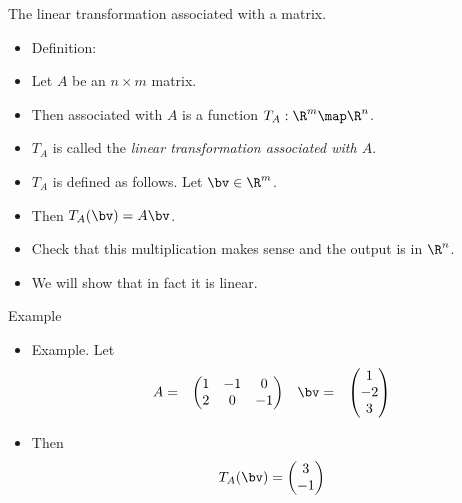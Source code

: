 \documentclass{beamer}
\begin{document}
\begin{frame}{The linear transformation associated with a matrix.}

\begin{itemize}
\item Definition:
\item Let $A$ be an $n\times m$ matrix.
\item Then associated with $A$ is a function $T_A:\R^m\map\R^n$.
\item $T_A$ is called the \emph{linear transformation associated with $A$}.
\item $T_A$ is defined as follows. Let $\bv\in\R^m$.
\item Then $T_A(\bv) = A \bv$.
\item Check that this multiplication makes sense and the output is in $\R^n$.
\item We will show that in fact it is linear.
\end{itemize}
\end{frame}


\begin{frame}{Example}

\begin{itemize}
\item Example. Let
$$
\begin{matrix}
A =
&
\begin{pmatrix}
1 & -1  & 0 \\
2 &  0  & -1
\end{pmatrix}
&
\bv =
&
\begin{pmatrix}
1 \\ -2 \\ 3
\end{pmatrix}
\end{matrix}
$$
\item Then
$$
T_A(\bv) =
\begin{pmatrix}
3 \\-1
\end{pmatrix}
$$
\end{itemize}

\end{frame}
\end{document}
